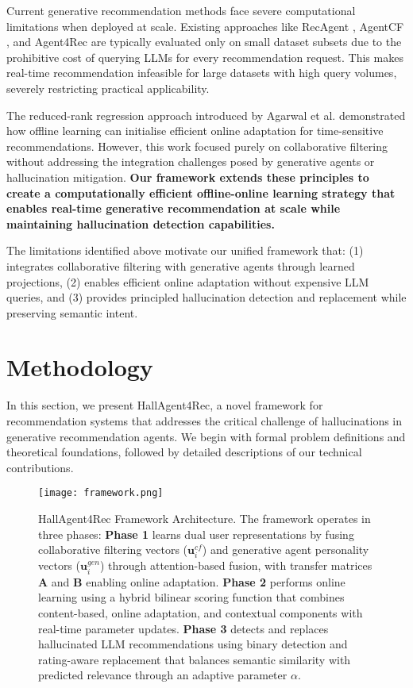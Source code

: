 \documentclass[acmsmall]{acmart}
\begin{document}
Current generative recommendation methods face severe computational limitations when deployed at scale. Existing approaches like RecAgent \cite{mitchell2024recagent}, AgentCF \cite{zhang2024agentcf}, and Agent4Rec \cite{zhang2024generative} are typically evaluated only on small dataset subsets due to the prohibitive cost of querying LLMs for every recommendation request. This makes real-time recommendation infeasible for large datasets with high query volumes, severely restricting practical applicability.

The reduced-rank regression approach introduced by Agarwal et al. \cite{agarwal2010fast} demonstrated how offline learning can initialise efficient online adaptation for time-sensitive recommendations. However, this work focused purely on collaborative filtering without addressing the integration challenges posed by generative agents or hallucination mitigation. \textbf{Our framework extends these principles to create a computationally efficient offline-online learning strategy that enables real-time generative recommendation at scale while maintaining hallucination detection capabilities.}

The limitations identified above motivate our unified framework that: (1) integrates collaborative filtering with generative agents through learned projections, (2) enables efficient online adaptation without expensive LLM queries, and (3) provides principled hallucination detection and replacement while preserving semantic intent.

\section{Methodology}

In this section, we present HallAgent4Rec, a novel framework for recommendation systems that addresses the critical challenge of hallucinations in generative recommendation agents. We begin with formal problem definitions and theoretical foundations, followed by detailed descriptions of our technical contributions.

\begin{figure}
    \centering
    \texttt{[image: framework.png]}
    \caption{HallAgent4Rec Framework Architecture. The framework operates in three phases: \textbf{Phase 1} learns dual user representations by fusing collaborative filtering vectors ($\mathbf{u}^{cf}_i$) and generative agent personality vectors ($\mathbf{u}^{gen}_i$) through attention-based fusion, with transfer matrices $\mathbf{A}$ and $\mathbf{B}$ enabling online adaptation. \textbf{Phase 2} performs online learning using a hybrid bilinear scoring function that combines content-based, online adaptation, and contextual components with real-time parameter updates. \textbf{Phase 3} detects and replaces hallucinated LLM recommendations using binary detection and rating-aware replacement that balances semantic similarity with predicted relevance through an adaptive parameter $\alpha$.}
    \label{fig:framework}
\end{figure}
\end{document}

